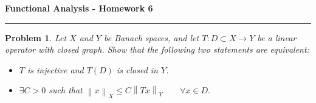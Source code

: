 \documentclass{article}
\newcommand{\norm}[1]{\left\|#1\right\|}
\newtheorem{problem}{Problem}
\begin{document}
\begin{center}
    \textbf{\Large Functional Analysis - Homework 6}
\end{center}

\hrule
\vspace{0.5em}

\begin{problem}
    
    Let $ X $ and $ Y $ be Banach spaces, and let $ T : D \subset X \to Y $ be a linear operator with closed graph.  
    Show that the following two statements are equivalent:
    \begin{itemize}
        \item[(a)] $ T $ is injective and $ T(D) $ is closed in $ Y $.
        \item[(b)] $ \exists C > 0 $ such that $\norm{x}_X \le C \norm{Tx}_Y \qquad \forall x \in D.$
    \end{itemize}
\end{problem}
\end{document}
